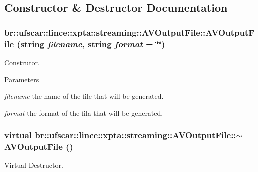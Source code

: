 \subsection{Constructor \& Destructor Documentation}
\hypertarget{classbr_1_1ufscar_1_1lince_1_1xpta_1_1streaming_1_1AVOutputFile_a974ab5f4710f389613902efcf0869cd2}{
\subsubsection[{AVOutputFile}]{\setlength{\rightskip}{0pt plus 5cm}br::ufscar::lince::xpta::streaming::AVOutputFile::AVOutputFile (string {\em filename}, \/  string {\em format} = {\ttfamily \char`\"{}\char`\"{}})}}
\label{classbr_1_1ufscar_1_1lince_1_1xpta_1_1streaming_1_1AVOutputFile_a974ab5f4710f389613902efcf0869cd2}


Construtor. 


\begin{DoxyParams}{Parameters}
\item[{\em filename}]the name of the file that will be generated. \item[{\em format}]the format of the fila that will be generated. \end{DoxyParams}
\hypertarget{classbr_1_1ufscar_1_1lince_1_1xpta_1_1streaming_1_1AVOutputFile_a98e890c64fa56a855c1e913c931bbd86}{
\subsubsection[{$\sim$AVOutputFile}]{\setlength{\rightskip}{0pt plus 5cm}virtual br::ufscar::lince::xpta::streaming::AVOutputFile::$\sim$AVOutputFile ()}}
\label{classbr_1_1ufscar_1_1lince_1_1xpta_1_1streaming_1_1AVOutputFile_a98e890c64fa56a855c1e913c931bbd86}


Virtual Destructor. 



